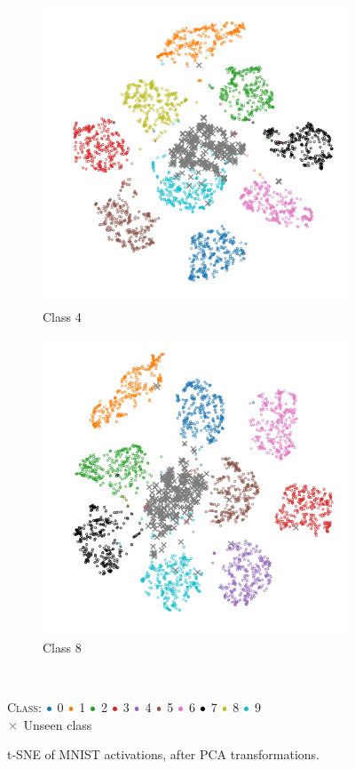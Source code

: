 \documentclass[10pt]{article}
\newcommand{\legendBulletMNIST}{
    \begin{minipage}[t]{0.5\textwidth}
    \centering
    \textsc{Class}:
    ${\color[rgb]{0.12, 0.47, 0.71}\bullet}$ 0
    ${\color[rgb]{1.0, 0.5, 0.05}\bullet}$ 1
    ${\color[rgb]{0.17, 0.63, 0.17}\bullet}$ 2
    ${\color[rgb]{0.84, 0.15, 0.16}\bullet}$ 3
    ${\color[rgb]{0.58, 0.4, 0.74}\bullet}$ 4
    ${\color[rgb]{0.55, 0.34, 0.29}\bullet}$ 5
    ${\color[rgb]{0.89, 0.47, 0.76}\bullet}$ 6
    ${\color[rgb]{0, 0, 0}\bullet}$ 7
    ${\color[rgb]{0.74, 0.74, 0.13}\bullet}$ 8
    ${\color[rgb]{0.09, 0.75, 0.81}\bullet}$ 9\\
    ${\color[rgb]{0.5, 0.5, 0.5}\boldsymbol{\times}}$ Unseen class
    \end{minipage}
    }
\begin{document}
\begin{figure}[H]
    \centering
    \begin{subfigure}{.49\textwidth}
        \centering
        \includegraphics[width=\textwidth]{MNIST_t-SNE_wo_cl_4_after}
        \caption{Class 4}
    \end{subfigure}
    \begin{subfigure}{.5\textwidth}
        \centering
        \includegraphics[width=\textwidth]{MNIST_t-SNE_wo_cl_8_after}
        \caption{Class 8}
    \end{subfigure}
    \\[.2cm]
    \legendBulletMNIST
    \caption{t-SNE of \gls{MNIST} activations, after \gls{PCA} transformations.}
    \label{fig:tsne-mnist-miscl}
\end{figure}
\end{document}
